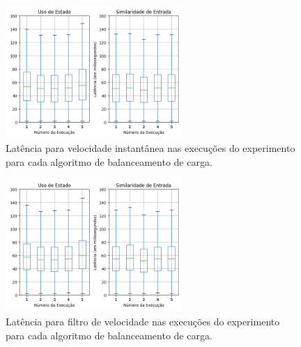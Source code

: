 




\begin{figure}[p]
\centering
 \includegraphics[width=0.6\textwidth]{figuras/graphics/boxplot_agg_vf.png}
 \caption{Latência para velocidade instantânea nas execuções do experimento para cada algoritmo de balanceamento de carga.}
 \label{fig:boxplot_vf_agg_1}
\end{figure}


\begin{figure}[p]
  \centering
\includegraphics[width=0.6\textwidth]{figuras/graphics/boxplot_agg_vi.png}
\caption{Latência para filtro de velocidade nas execuções do experimento para cada algoritmo de balanceamento de carga.}
\label{fig:boxplot_vi_agg_1}
\end{figure}

